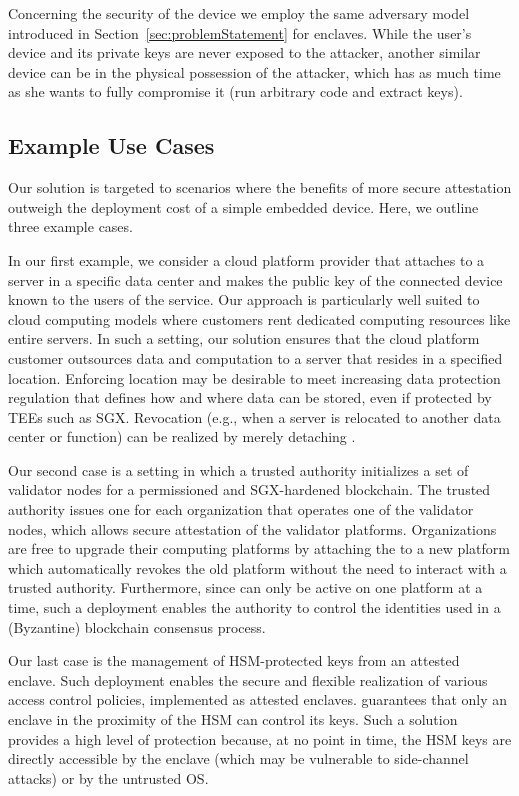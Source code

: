 Concerning the security of the \device device we employ the same adversary model introduced in Section~\ref{sec:problemStatement} for enclaves. While the user's device and its private keys are never exposed to the attacker, another similar device can be in the physical possession of the attacker, which has as much time as she wants to fully compromise it (run arbitrary code and extract keys). 


\subsection{Example Use Cases}
\label{sec:use-cases}

Our solution is targeted to scenarios where the benefits of more secure attestation outweigh the deployment cost of a simple embedded device. Here, we outline three example cases.  

 In our first example, we consider a cloud platform provider that attaches \device to a server in a specific data center and makes the public key of the connected device known to the users of the service. Our approach is particularly well suited to cloud computing models where customers rent dedicated computing resources like entire servers. In such a setting, our solution ensures that the cloud platform customer outsources data and computation to a server that resides in a specified location. Enforcing location may be desirable to meet increasing data protection regulation that defines how and where data can be stored, even if protected by TEEs such as SGX. Revocation (e.g., when a server is relocated to another data center or function) can be realized by merely detaching \device.

 Our second case is a setting in which a trusted authority initializes a set of validator nodes for a permissioned and SGX-hardened blockchain. 
The trusted authority issues one \device for each organization that operates one of the validator nodes, which allows secure attestation of the validator platforms. Organizations are free to upgrade their computing platforms by attaching the \device to a new platform which automatically revokes the old platform without the need to interact with a trusted authority. Furthermore, since \device can only be active on one platform at a time, such a deployment enables the authority to control the identities used in a (Byzantine) blockchain consensus process.



 Our last case is the management of HSM-protected keys from an attested enclave. Such deployment enables the secure and flexible realization of various access control policies, implemented as attested enclaves. \name guarantees that only an enclave in the proximity of the HSM can control its keys. Such a solution provides a high level of protection because, at no point in time, the HSM keys are directly accessible by the enclave (which may be vulnerable to side-channel attacks) or by the untrusted OS.


